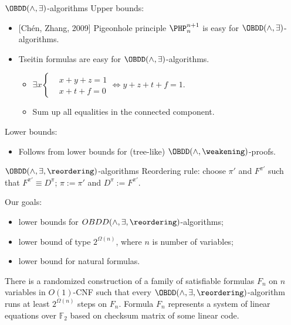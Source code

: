 \begin{frame}{$\OBDD(\land, \exists)$-algorithms}
	Upper bounds:
    \begin{itemize}
        \item{} [Ch{\'{e}}n, Zhang, 2009] Pigeonhole principle $\PHP^{n + 1}_n$ is easy for $\OBDD(\land,
            \exists)$-algorithms.
        \item Tseitin formulas are easy for $\OBDD(\land, \exists)$-algorithms.
            \begin{itemize}
                \item $\exists x \left\{
                    \begin{aligned}
                        & x + y + z = 1 \\
                        & x + t + f = 0
                    \end{aligned}\right.
                    \Leftrightarrow y + z + t + f = 1$.
                \item Sum up all equalities in the connected component.
            \end{itemize}
    \end{itemize}
    
    Lower bounds:
    \begin{itemize}
        \item Follows from lower bounds for (tree-like) $\OBDD(\land, \weakening)$-proofs.
    \end{itemize}    
\end{frame}


\begin{frame}{$\OBDD(\land, \exists, \reordering)$-algorithms}
	Reordering rule: choose $\pi'$ and $F^{\pi'}$ such that $F^{\pi'} \equiv D^{\pi}$; $\pi := \pi'$ and $D^{\pi} := F^{\pi'}$.

    \vspace{0.3cm}
    
    Our goals:
    \begin{itemize}
        \item lower bounds for $OBDD(\land, \exists, \reordering)$-algorithms;
        \item lower bound of type $2^{\Omega(n)}$, where $n$ is number of variables;
        \item lower bound for natural formulas.
    \end{itemize}

    \pause
    \begin{theorem}
        There is a randomized construction of a family of satisfiable formulas $F_n$ on $n$ variables in
        $O(1)$-CNF such that every $\OBDD(\land, \exists, \reordering)$-algorithm runs at least
        $2^{\Omega(n)}$ steps on $F_n$. Formula $F_n$ represents a system of linear equations over
        $\mathbb{F}_2$ based on checksum matrix of some linear code.    
    \end{theorem}
\end{frame}